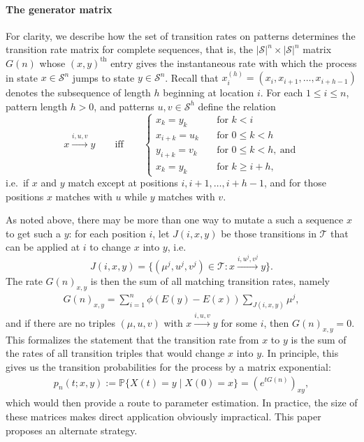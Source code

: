 \documentclass{article}
\renewcommand{\P}{\mathbb{P}}
\newcommand{\calS}{\mathcal{S}}  %
\newcommand{\calT}{\mathcal{T}}  %
\newcommand{\st}{\colon}  %
\theoremstyle{plain}
\theoremstyle{definition}
\begin{document}
\paragraph{The generator matrix}
For clarity, we describe how the set of transition rates on patterns determines the transition rate matrix for complete sequences, that is,
the $|\calS|^n \times |\calS|^n$ matrix $G(n)$ whose $(x,y)^\text{th}$ entry gives the instantaneous rate
with which the process in state $x \in \calS^n$ jumps to state $y \in \calS^n$.
Recall that $x_i^{(h)} = (x_i, x_{i+1}, \ldots, x_{i+h-1})$ denotes the subsequence of length $h$ beginning at location $i$.
For each $1\le i \le n$, pattern length $h > 0$, and patterns $u,v \in \calS^h$ define the relation
\[
x \xrightarrow{i,u,v} y \qquad \text{iff} \qquad \begin{cases}
  x_k = y_k \quad &\text{for } k<i \\
  x_{i+k} = u_k \quad &\text{for } 0 \le k < h \\
  y_{i+k} = v_k \quad &\text{for } 0 \le k < h,\ \text{and} \\
  x_k = y_k \quad &\text{for } k\ge i+h ,
\end{cases}
\]
i.e.\ if $x$ and $y$ match except at positions $i,i+1,\ldots,i+h-1$,
and for those positions $x$ matches with $u$ while $y$ matches with $v$.

As noted above, there may be more than one way to mutate a such a sequence $x$ to get such a $y$:
for each position $i$, let $J(i,x,y)$ be those transitions in $\calT$ that can be applied at $i$
to change $x$ into $y$, i.e.
\[
J(i,x,y) = \{ (\mu^j,u^j,v^j) \in \calT \st x \xrightarrow{i,u^j,v^j} y \}.
\]
The rate $G(n)_{x,y}$ is then the sum of all matching transition rates,
namely
\begin{align} \label{eqn:G_defn}
    G(n)_{x,y} = \sum_{i=1}^n \phi(E(y)-E(x)) \sum_{J(i,x,y)}  \mu^j ,
\end{align}
and if there are no triples $(\mu,u,v)$ with $x \xrightarrow{i,u,v} y$ for some $i$, then $G(n)_{x,y}=0$.
This formalizes the statement that the transition rate from $x$ to $y$ is the sum of the rates of all transition triples
that would change $x$ into $y$.
In principle, this gives us the transition probabilities for the process by a matrix exponential:
\begin{align} \label{eqn:full_likelihood}
    p_n(t;x,y) := \P\{ X(t) = y \mid X(0) = x \} = \left(e^{tG(n)}\right)_{xy} ,
\end{align}
which would then provide a route to parameter estimation.
In practice, the size of these matrices makes direct application obviously impractical.
This paper proposes an alternate strategy.
\end{document}

